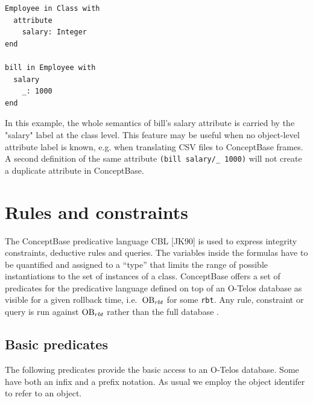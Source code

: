 \begin{verbatim}
Employee in Class with
  attribute
    salary: Integer
end

bill in Employee with
  salary
    _: 1000
end
\end{verbatim}

In this example, the whole semantics of bill's salary attribute is carried by the "salary" label at the class level. 
This feature may be useful when no object-level attribute label is known, e.g. when translating CSV files to
ConceptBase frames.
A second definition of the same attribute {\tt (bill salary/\_ 1000)} will not create a duplicate attribute in ConceptBase.



\section{Rules and constraints}
\label{sec:CBL}

The ConceptBase predicative language CBL [JK90] is used to express
integrity constraints, deductive rules and queries. The variables inside
the formulas have to be quantified and assigned to a ``type'' that limits the
range of possible instantiations to the set of instances of a class.
ConceptBase offers a set of predicates for the predicative language defined
on top of an O-Telos database as visible for a given rollback time,
i.e.\  $\hbox{\rm OB}_{rbt}$ for some {\tt rbt}. Any rule, constraint or
query is run against $\hbox{\rm OB}_{rbt}$ rather than the full database {\OB}.



\subsection{Basic predicates}
The following predicates
provide the basic access to an O-Telos database. Some have both an
infix and a prefix notation. As usual we employ the object identifer to refer to an object.


